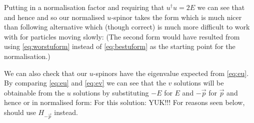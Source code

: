 Putting in a normalisation factor
%
and requiring that $u^\dag u=2 E$ we can see that
%
and hence
%
and so our normalised $u$-spinor takes the form
%
which is much nicer than following alternative which (though correct) is much more difficult to work with for particles moving slowly:
(The second form would have resulted from using \eqref{eq:worstuform} instead of \eqref{eq:bestuform} as the starting point for the normalisation.)


We can also check that our $u$-spinors have the eigenvalue expected from \eqref{eq:eu}.
By comparing \eqref{eq:eu} and 
\eqref{eq:ev} we can see that the $v$ solutions will be obtainable from the $u$ solutions by substituting $-E$ for $E$ and $-\vec p$ for $\vec p$ and hence
or in normalised form:
For this solution:
YUK!!!  For reasons seen below, should use $H_{-\vec p}$ instead.

